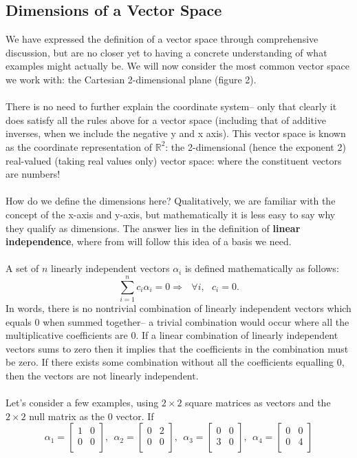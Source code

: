 \subsection{Dimensions of a Vector Space}
We have expressed the definition of a vector space through comprehensive discussion, but are no closer yet to having a concrete understanding of what examples might actually be. We will now consider the most common vector space we work with: the Cartesian 2-dimensional plane (figure 2).
\\\\
There is no need to further explain the coordinate system-- only that clearly it does satisfy all the rules above for a vector space (including that of additive inverses, when we include the negative y and x axis). This vector space is known as the coordinate representation of $\mathbb{R}^2$: the 2-dimensional (hence the exponent 2) real-valued (taking real values only) vector space: where the constituent vectors are numbers!
\\\\
How do we define the dimensions here? Qualitatively, we are familiar with the concept of the x-axis and y-axis, but mathematically it is less easy to say why they qualify as dimensions. The answer lies in the definition of \textbf{linear independence}, where from will follow this idea of a basis we need.
\\\\
A set of $n$ linearly independent vectors $\alpha_{i}$ is defined mathematically as follows:
$$
\sum_{i=1}^{n}c_{i}\alpha_{i}=0 \Rightarrow\:\:\: \forall i, \:\:\: c_{i}=0.
$$
In words, there is no nontrivial combination of linearly independent vectors which equals $0$ when summed together-- a trivial combination would occur where all the multiplicative coefficients are 0. If a linear combination of linearly independent vectors sums to zero then it implies that the coefficients in the combination must be zero. If there exists some combination without all the coefficients equalling 0, then the vectors are not linearly independent. 
\\\\
Let's consider a few examples, using $2\times2$ square matrices as vectors and the $2\times2$ null matrix as the 0 vector. If
$$
\alpha_{1} = \begin{bmatrix}
    1 & 0 \\
    0 & 0 \\
    \end{bmatrix}, \:\:
\alpha_{2} = \begin{bmatrix}
    0 & 2 \\
    0 & 0 \\
    \end{bmatrix}, \:\:
\alpha_{3}= \begin{bmatrix}
    0 & 0 \\
    3 & 0 \\
    \end{bmatrix}, \:\:
\alpha_{4} = \begin{bmatrix}
    0 & 0 \\
    0 & 4 \\
    \end{bmatrix}
$$
